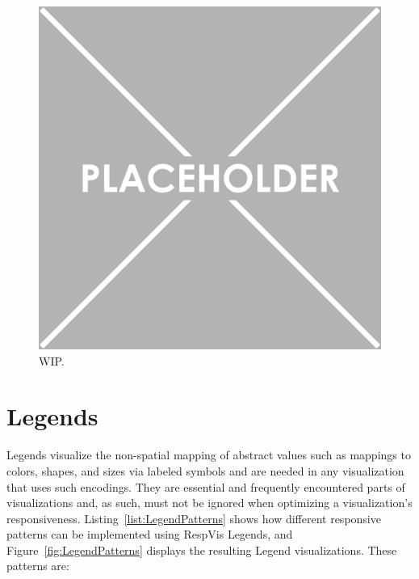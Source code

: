 \begin{samepage}
%
    WIP
  },
]{listings/axis-patterns.html}
\end{samepage}

\begin{figure}[tp]
\centering
\includegraphics[keepaspectratio,width=\linewidth,height=\fullh]{images/placeholder.png}
\caption[Results of Axis-Related Responsive Patterns]{
  WIP.
}
\label{fig:AxisPatterns}
\end{figure}

\section{Legends}
\label{sec:LegendsUsage}

Legends visualize the non-spatial mapping of abstract values such as mappings to colors, shapes, and sizes via labeled symbols and are needed in any visualization that uses such encodings.
They are essential and frequently encountered parts of visualizations and, as such, must not be ignored when optimizing a visualization's responsiveness. 
Listing~\ref{list:LegendPatterns} shows how different responsive patterns can be implemented using RespVis Legends, and Figure~\ref{fig:LegendPatterns} displays the resulting Legend visualizations.
These patterns are:


